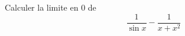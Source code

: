 Calculer la limite en $0$ de
\begin{displaymath}
 \frac{1}{\sin x}-\frac{1}{x+x^2}
\end{displaymath}
\bigskip 

